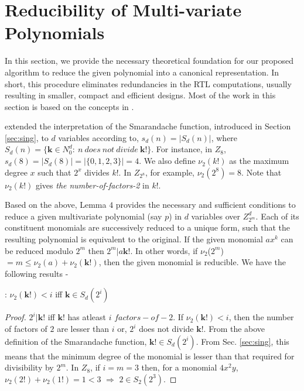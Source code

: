 \section{Reducibility of Multi-variate Polynomials}\label{sec:multi}
In this section, we provide the necessary theoretical foundation for our proposed algorithm to reduce the given polynomial
into a canonical representation. In short, this procedure eliminates redundancies in the RTL computations, usually
resulting in smaller, compact and efficient designs. Most of the work in this section is based on the concepts in
\cite{smarandache_function}.

\cite{smarandache_function} extended the interpretation of the Smarandache function, introduced in Section \ref{sec:sing},
to $d$ variables according to, $s_d(n) = |S_d(n)|$, where $S_d(n) = \{\textbf{k} \in N^d_0:~n ~does ~not ~divide
~\textbf{k!}\}$. For instance, in $Z_8$, $s_d(8) = |S_d(8)| = |\{0,1,2,3\}| = 4$.
We also define $\nu_2(k!)$ as the maximum degree $x$ such that $2^x$ divides $k!$. In $Z_{2^8}$, for example, $\nu_2(2^8) =
8$. Note that $\nu_2(k!)$ gives \textit{the number-of-factors-2} in $k!$.

Based on the above, Lemma $4$ \cite{smarandache_function} provides the necessary and sufficient conditions to reduce a given
multivariate polynomial (say $p$) in $d$ variables over $Z_{2^m}^d$. Each of its constituent monomials are successively
reduced to a unique form, such that the resulting polynomial is equivalent to the original. If the given monomial
$a$\textbf{$x^{k}$} can be reduced modulo $2^m$ then $2^m|a\textbf{k!}$. In other words, if $\nu_2$(\textbf{$2^m$}) $= m
\leq \nu_2(a) +
\nu_2(\textbf{k!})$, then the given monomial is reducible. We have the following results -

\begin{theorem}: \label{th:nu} $\nu_2(\textbf{k!}) < i$ iff $\textbf{k} \in S_d(2^i)$
\end{theorem}
\begin{proof}
$2^i|\textbf{k!}$ iff $\textbf{k!}$ has atleast $i$ $factors-of-2$. If  $\nu_2(\textbf{k!}) < i$, then the number of factors
of $2$ are lesser than $i$ or, $2^i$ does not divide $\textbf{k!}$. From the above definition of the Smarandache function,
$\textbf{k!} \in S_d(2^i)$. From Sec. \ref{sec:sing}, this means that the minimum degree of the monomial is lesser than that
required for divisibility by $2^m$. In $Z_8$, if $i=m=3$ then, for a monomial $4x^2y$, $\nu_2(2!) + \nu_2(1!) = 1 < 3$ $\Rightarrow$ $2 \in S_2(2^3)$.
\end{proof}

